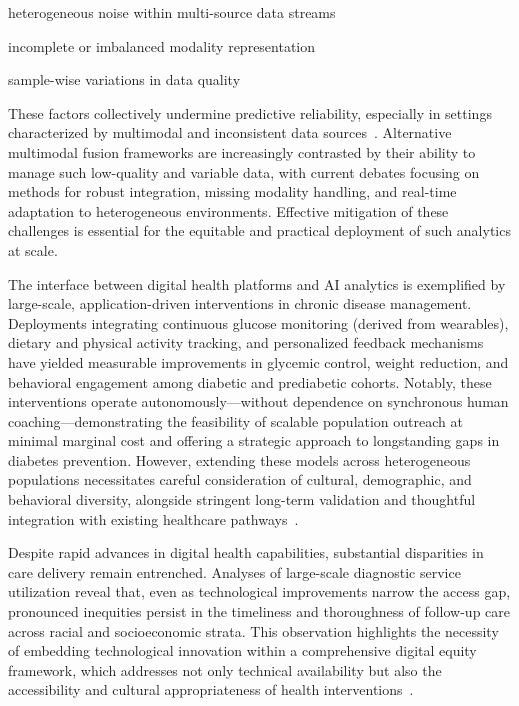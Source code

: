 \documentclass[sigconf]{acmart}
\begin{document}
heterogeneous noise within multi-source data streams

incomplete or imbalanced modality representation

sample-wise variations in data quality

These factors collectively undermine predictive reliability, especially in settings characterized by multimodal and inconsistent data sources~\cite{ref78}. Alternative multimodal fusion frameworks are increasingly contrasted by their ability to manage such low-quality and variable data, with current debates focusing on methods for robust integration, missing modality handling, and real-time adaptation to heterogeneous environments. Effective mitigation of these challenges is essential for the equitable and practical deployment of such analytics at scale.

The interface between digital health platforms and AI analytics is exemplified by large-scale, application-driven interventions in chronic disease management. Deployments integrating continuous glucose monitoring (derived from wearables), dietary and physical activity tracking, and personalized feedback mechanisms have yielded measurable improvements in glycemic control, weight reduction, and behavioral engagement among diabetic and prediabetic cohorts. Notably, these interventions operate autonomously—without dependence on synchronous human coaching—demonstrating the feasibility of scalable population outreach at minimal marginal cost and offering a strategic approach to longstanding gaps in diabetes prevention. However, extending these models across heterogeneous populations necessitates careful consideration of cultural, demographic, and behavioral diversity, alongside stringent long-term validation and thoughtful integration with existing healthcare pathways~\cite{ref69}.

Despite rapid advances in digital health capabilities, substantial disparities in care delivery remain entrenched. Analyses of large-scale diagnostic service utilization reveal that, even as technological improvements narrow the access gap, pronounced inequities persist in the timeliness and thoroughness of follow-up care across racial and socioeconomic strata. This observation highlights the necessity of embedding technological innovation within a comprehensive digital equity framework, which addresses not only technical availability but also the accessibility and cultural appropriateness of health interventions~\cite{ref85,ref63}.
\end{document}
